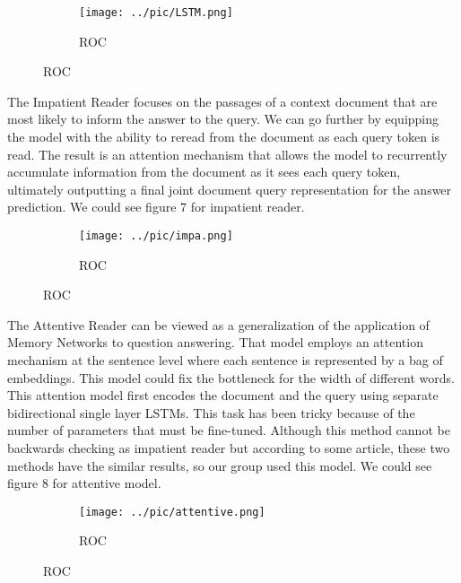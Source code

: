 \documentclass[runningheads,a4paper]{llncs}
\begin{document}
\begin{figure}[p]
	\centering
	\begin{subfigure}{.5\textwidth}
		\centering
		\texttt{[image: ../pic/LSTM.png]}
		\caption{ROC}
		\label{figure 6:LSTM}
	\end{subfigure}
\end{figure}



The Impatient Reader focuses on the passages of a context document that are most likely to inform the answer to the query. We can go further by equipping the model with the ability to reread from the document as each query token is read. The result is an attention mechanism that allows the model to recurrently accumulate information from the document as it sees each query token, ultimately outputting a final joint document query representation for the answer prediction. We could see figure 7 for impatient reader.
\begin{figure}[p]
	\begin{subfigure}{.5\textwidth}
		\centering
		\texttt{[image: ../pic/impa.png]}
		\caption{ROC}
		\label{figure 7:impatient reader}
	\end{subfigure}
\end{figure}

The Attentive Reader can be viewed as a generalization of the application of Memory Networks to question answering. That model employs an attention mechanism at the sentence level where each sentence is represented by a bag of embeddings. This model could fix the bottleneck for the width of different words. This attention model first encodes the document and the query using separate bidirectional single layer LSTMs. This task has been tricky because of the number of parameters that must be fine-tuned.
Although this method cannot be backwards checking as impatient reader but according to some article, these two methods have the similar results, so our group used this model. We could see figure 8 for attentive model.
\begin{figure}[p]
	\centering
	\begin{subfigure}{.5\textwidth}
		\centering
		\texttt{[image: ../pic/attentive.png]}
		\caption{ROC}
		\label{figure 8:attentive model}
	\end{subfigure}	
\end{figure}
\end{document}

